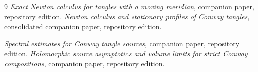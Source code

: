 \documentclass[11pt]{article}
\numberwithin{equation}{section}
\theoremstyle{definition}\newtheorem{definition}[theorem]{Definition}
\begin{document}
\begin{thebibliography}{9}
\emph{Exact Newton calculus for tangles with a moving meridian}, companion paper,
\href{https://sashakolpakov.github.io/murakamis_dream/papers/meridian-tangles.pdf}{repository edition}.
\emph{Newton calculus and stationary profiles of Conway tangles},
consolidated companion paper,
\href{https://sashakolpakov.github.io/murakamis_dream/papers/newton-calculus.pdf}{repository edition}.

\emph{Spectral estimates for Conway tangle sources}, companion paper,
\href{https://sashakolpakov.github.io/murakamis_dream/papers/conway-source-bounds.pdf}{repository edition}.
\emph{Holomorphic source asymptotics and volume limits for strict Conway compositions}, companion paper,
\href{https://sashakolpakov.github.io/murakamis_dream/papers/conway-asymptotics.pdf}{repository edition}.
\end{thebibliography}
\end{document}
